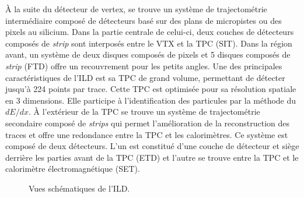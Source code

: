   \medskip
  
  \`A la suite du d\'etecteur de vertex, se trouve un système de trajectom\'etrie interm\'ediaire compos\'e de détecteurs bas\'e sur des plans de micropistes ou des pixels au silicium. Dans la partie centrale de celui-ci, deux couches de d\'etecteurs compos\'es de \textit{strip} sont interpos\'es entre le VTX et la TPC (SIT). Dans la r\'egion avant, un syst\`eme de deux disques compos\'es de pixels et 5 disques compos\'es de \textit{strip} (FTD) offre un recouvrement pour les petits angles. Une des principales caract\'eristiques de l'ILD est sa TPC de grand volume, permettant de d\'etecter jusqu'\`a 224 points par trace. Cette TPC est optimis\'ee pour sa résolution spatiale en 3 dimensions. Elle participe \`a l'identification des particules par la m\'ethode du $dE/dx$. \`A l'ext\'erieur de la TPC se trouve un syst\`eme de trajectom\'etrie secondaire compos\'e de \textit{strips} qui permet l'am\'elioration de la reconstruction des traces et offre une redondance entre la TPC et les calorim\`etres. Ce syst\`eme est compos\'e de deux d\'etecteurs. L'un est constitu\'e d'une couche de d\'etecteur et si\`ege derrière les parties avant de la TPC (ETD) et l'autre se trouve entre la TPC et le calorim\`etre \'electromagn\'etique (SET).
  
  \medskip
  
    \begin{figure}[htb!]
     \begin{center}
     \end{center}
     \caption{Vues sch\'ematiques de l'ILD.}
     \label{fig:detector_ILD}
   \end{figure}
  
